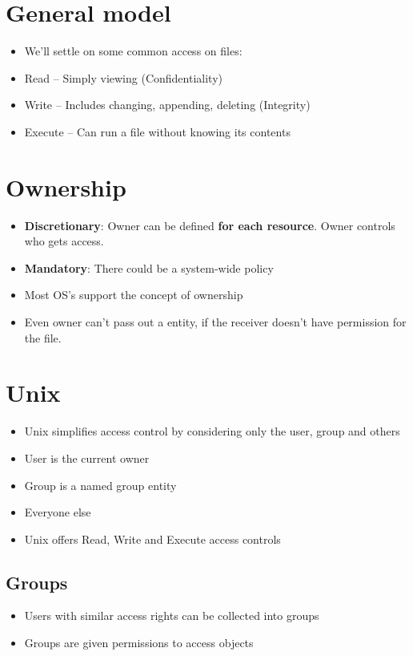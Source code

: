\documentclass{article}
\begin{document}
\section{General model}
\begin{itemize}
  \item We’ll settle on some common access on files: 
  \item Read – Simply viewing (Confidentiality) 
  \item Write – Includes changing, appending, deleting (Integrity) 
  \item Execute – Can run a file without knowing its contents
\end{itemize}

\section{Ownership}
\begin{itemize}
  \item \textbf{Discretionary}: Owner can be defined \textbf{for each resource}. Owner controls who gets access.
  \item \textbf{Mandatory}: There could be a system-wide policy 
  \item Most OS’s support the concept of ownership
  \item Even owner can't pass out a entity, if the receiver doesn't have permission for the file.
\end{itemize}

\section{Unix}
\begin{itemize}
  \item Unix simplifies access control by considering only the user, group and others 
  \item User is the current owner 
  \item Group is a named group entity 
  \item Everyone else 
  \item Unix offers Read, Write and Execute access controls
\end{itemize}

\subsection{Groups}
\begin{itemize}
  \item Users with similar access rights can be collected into groups 
  \item Groups are given permissions to access objects
\end{itemize}
\end{document}
